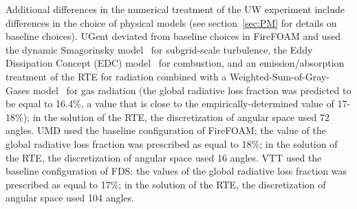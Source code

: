 Additional differences in the numerical treatment of the UW experiment include differences in the choice of physical models (see section~\ref{sec:PM} for details on baseline choices). UGent deviated from baseline choices in FireFOAM and used the dynamic Smagorinsky model~\cite{Moin:1991} for subgrid-scale turbulence, the Eddy Dissipation Concept (EDC) model~\cite{Magnussen:1981} for combustion, and an emission/absorption treatment of the RTE for radiation combined with a Weighted-Sum-of-Gray-Gases model~\cite{Dorigon:2013} for gas radiation (the global radiative loss fraction was predicted to be equal to 16.4\%, a value that is close to the empirically-determined value of 17-18\%); in the solution of the RTE, the discretization of angular space used 72 angles. UMD used the baseline configuration of FireFOAM; the value of the global radiative loss fraction was prescribed as equal to 18\%; in the solution of the RTE, the discretization of angular space used 16 angles. VTT used the baseline configuration of FDS: the values of the global radiative loss fraction was prescribed as equal to 17\%; in the solution of the RTE, the discretization of angular space used 104 angles.

